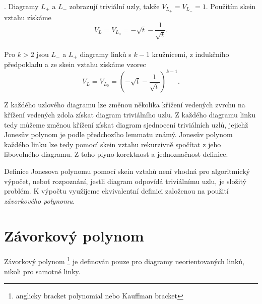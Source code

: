 \begin{dukaz}
. Diagramy $L_+$ a $L_-$ zobrazují triviální uzly, takže $V_{L_+} = V_{L_-} = 1$. Použitím skein vztahu získáme $$V_ L = V_{L_0} = - \sqrt{t} -\frac{1}{\sqrt{t}} .$$ \\
Pro $k > 2$ jsou $L_-$ a $L_+ $ diagramy linků s $k-1$ kružnicemi, z indukčního předpokladu a ze skein vztahu získáme vzorec $$V_ L = V_{L_0} = \left(- \sqrt{t} -\frac{1}{\sqrt{t}}\right) ^{k-1}.$$
\end{dukaz}  

\begin{pozn}
Z každého uzlového diagramu lze změnou několika křížení vedených zvrchu na křížení vedených zdola získat diagram triviálního uzlu. Z každého diagramu linku tedy můžeme změnou křížení získat diagram sjednocení triviálních uzlů, jejichž Jonesův polynom je podle předchozího lemmatu známý. Jonesův polynom každého linku lze tedy pomocí skein vztahu rekurzivně spočítat z jeho libovolného diagramu. Z toho plyno korektnost a jednoznačnost definice.
\end{pozn}


Definice Jonesova polynomu pomocí skein vztahů není vhodná pro algoritmický výpočet, neboť rozpoznání, jestli diagram odpovídá triviálnímu uzlu, je složitý problém. K výpočtu využijeme ekvivalentní definici založenou na použití \emph{závorkového polynomu}.

\section{Závorkový polynom}
Závorkový polynom \footnote{anglicky bracket polynomial nebo Kauffman bracket} je definován pouze pro diagramy neorientovaných linků, nikoli pro samotné linky.

